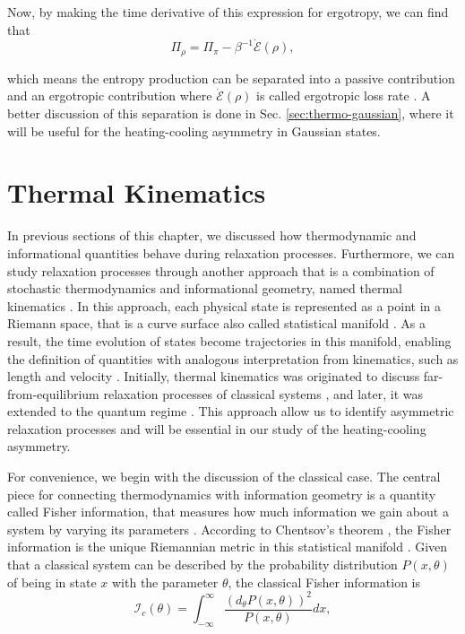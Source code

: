 \noindent Now, by making the time derivative of this expression for ergotropy, we can find that
\begin{equation}
    \Pi_\rho = \Pi_\pi - \beta^{-1} \dot{\mathcal{E}}({\rho}),
    \label{eq:sprod-passive-ergotropic}
\end{equation}

\noindent which means the entropy production can be separated into a passive contribution and an ergotropic contribution where $\dot{\mathcal{E}}({\rho})$ is called ergotropic loss rate \cite{medina-2025, medina-2026}. A better discussion of this separation is done in Sec. \ref{sec:thermo-gaussian}, where it will be useful for the heating-cooling asymmetry in Gaussian states.


\section{Thermal Kinematics} \label{sec:thermal-kinematics}

In previous sections of this chapter, we discussed how thermodynamic and informational quantities behave during relaxation processes. Furthermore, we can study relaxation processes through another approach that is a combination of stochastic thermodynamics and informational geometry, named thermal kinematics \cite{ibanez-2024}. In this approach, each physical state is represented as a point in a Riemann space, that is a curve surface also called statistical manifold \cite{crooks-2007, ito-2018}. As a result, the time evolution of states become trajectories in this manifold, enabling the definition of quantities with analogous interpretation from kinematics, such as length and velocity \cite{ito-2018, dechant-2020}. Initially, thermal kinematics was originated to discuss far-from-equilibrium relaxation processes of classical systems \cite{ibanez-2024}, and later, it was extended to the quantum regime \cite{tejero-2025}. This approach allow us to identify asymmetric relaxation processes and will be essential in our study of the heating-cooling asymmetry.

For convenience, we begin with the discussion of the classical case. The central piece for connecting thermodynamics with information geometry is a quantity called Fisher information, that measures how much information we gain about a system by varying its parameters \cite{paris-2009, liu-2020}. According to Chentsov's theorem \cite{cencov-2000}, the Fisher information is the unique Riemannian metric in this statistical manifold \cite{crooks-2007, ito-2018, bettmann-2025}. Given that a classical system can be described by the probability distribution $P(x, \theta)$ of being in state $x$ with the parameter $\theta$, the classical Fisher information is
\begin{equation}
    \mathcal{I}_c(\theta) = \int_{-\infty}^{\infty} \frac{(d_\theta P(x, \theta))^2}{P(x, \theta)} dx,
    \label{eq:classical-fisher}
\end{equation}

